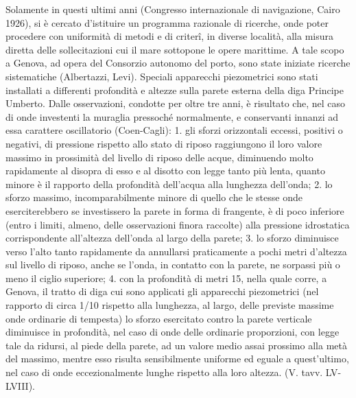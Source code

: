 \documentclass[a4paper]{article}
\begin{document}
Solamente in questi ultimi anni (Congresso internazionale di navigazione, Cairo 1926), si è cercato d'istituire un programma razionale di ricerche, onde poter procedere con uniformità di metodi e di criterî, in diverse località, alla misura diretta delle sollecitazioni cui il mare sottopone le opere marittime. A tale scopo a Genova, ad opera del Consorzio autonomo del porto, sono state iniziate ricerche sistematiche (Albertazzi, Levi). Speciali apparecchi piezometrici sono stati installati a differenti profondità e altezze sulla parete esterna della diga Principe Umberto. Dalle osservazioni, condotte per oltre tre anni, è risultato che, nel caso di onde investenti la muraglia pressoché normalmente, e conservanti innanzi ad essa carattere oscillatorio (Coen-Cagli): 1. gli sforzi orizzontali eccessi, positivi o negativi, di pressione rispetto allo stato di riposo raggiungono il loro valore massimo in prossimità del livello di riposo delle acque, diminuendo molto rapidamente al disopra di esso e al disotto con legge tanto più lenta, quanto minore è il rapporto della profondità dell'acqua alla lunghezza dell'onda; 2. lo sforzo massimo, incomparabilmente minore di quello che le stesse onde eserciterebbero se investissero la parete in forma di frangente, è di poco inferiore (entro i limiti, almeno, delle osservazioni finora raccolte) alla pressione idrostatica corrispondente all'altezza dell'onda al largo della parete; 3. lo sforzo diminuisce verso l'alto tanto rapidamente da annullarsi praticamente a pochi metri d'altezza sul livello di riposo, anche se l'onda, in contatto con la parete, ne sorpassi più o meno il ciglio superiore; 4. con la profondità di metri 15, nella quale corre, a Genova, il tratto di diga cui sono applicati gli apparecchi piezometrici (nel rapporto di circa 1/10 rispetto alla lunghezza, al largo, delle previste massime onde ordinarie di tempesta) lo sforzo esercitato contro la parete verticale diminuisce in profondità, nel caso di onde delle ordinarie proporzioni, con legge tale da ridursi, al piede della parete, ad un valore medio assai prossimo alla metà del massimo, mentre esso risulta sensibilmente uniforme ed eguale a quest'ultimo, nel caso di onde eccezionalmente lunghe rispetto alla loro altezza. (V. tavv. LV-LVIII).
\end{document}
